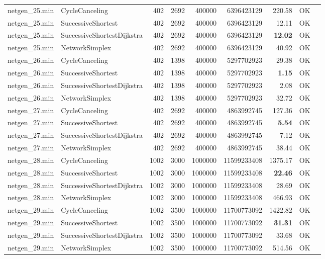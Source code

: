 \begin{longtable}{llrrrrrrl}
\midrule
netgen\_25.min & CycleCanceling & 402 & 2692 & 400000 & 6396423129 & 220.58 & OK \\
netgen\_25.min & SuccessiveShortest & 402 & 2692 & 400000 & 6396423129 & 12.11 & OK \\
netgen\_25.min & SuccessiveShortestDijkstra & 402 & 2692 & 400000 & 6396423129 & \textbf{12.02} & OK \\
netgen\_25.min & NetworkSimplex & 402 & 2692 & 400000 & 6396423129 & 40.92 & OK \\
\midrule
netgen\_26.min & CycleCanceling & 402 & 1398 & 400000 & 5297702923 & 29.38 & OK \\
netgen\_26.min & SuccessiveShortest & 402 & 1398 & 400000 & 5297702923 & \textbf{1.15} & OK \\
netgen\_26.min & SuccessiveShortestDijkstra & 402 & 1398 & 400000 & 5297702923 & 2.08 & OK \\
netgen\_26.min & NetworkSimplex & 402 & 1398 & 400000 & 5297702923 & 32.72 & OK \\
\midrule
netgen\_27.min & CycleCanceling & 402 & 2692 & 400000 & 4863992745 & 127.36 & OK \\
netgen\_27.min & SuccessiveShortest & 402 & 2692 & 400000 & 4863992745 & \textbf{5.54} & OK \\
netgen\_27.min & SuccessiveShortestDijkstra & 402 & 2692 & 400000 & 4863992745 & 7.12 & OK \\
netgen\_27.min & NetworkSimplex & 402 & 2692 & 400000 & 4863992745 & 38.44 & OK \\
\midrule
netgen\_28.min & CycleCanceling & 1002 & 3000 & 1000000 & 11599233408 & 1375.17 & OK \\
netgen\_28.min & SuccessiveShortest & 1002 & 3000 & 1000000 & 11599233408 & \textbf{22.46} & OK \\
netgen\_28.min & SuccessiveShortestDijkstra & 1002 & 3000 & 1000000 & 11599233408 & 28.69 & OK \\
netgen\_28.min & NetworkSimplex & 1002 & 3000 & 1000000 & 11599233408 & 466.93 & OK \\
\midrule
netgen\_29.min & CycleCanceling & 1002 & 3500 & 1000000 & 11700773092 & 1422.82 & OK \\
netgen\_29.min & SuccessiveShortest & 1002 & 3500 & 1000000 & 11700773092 & \textbf{31.31} & OK \\
netgen\_29.min & SuccessiveShortestDijkstra & 1002 & 3500 & 1000000 & 11700773092 & 33.68 & OK \\
netgen\_29.min & NetworkSimplex & 1002 & 3500 & 1000000 & 11700773092 & 514.56 & OK \\

\end{longtable}
